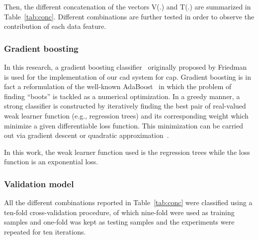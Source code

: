 Then, the different concatenation of the vectors V(.) and T(.) are summarized in Table~\ref{tab:conc}. Different combinations are further tested in order to observe the contribution of each data feature.

\subsubsection{Gradient boosting}\label{subsubsec:gradboost}

In this research, a gradient boosting classifier~\cite{Becker2013} originally proposed by Friedman~\cite{Friedman1999,Friedman2000} is used for the implementation of our \ac{cad} system for \ac{cap}. Gradient boosting is in fact a reformulation of the well-known AdaBoost~\cite{Freund1997} in which the problem of finding ``boots'' is tackled as a numerical optimization. In a greedy manner, a strong classifier is constructed by iteratively finding the best pair of real-valued weak learner function (e.g., regression trees) and its corresponding weight which minimize a given differentiable loss function. This minimization can be carried out via gradient descent or quadratic approximation~\cite{Zheng2008}.

In this work, the weak learner function used is the regression trees while the loss function is an exponential loss.

\subsubsection{Validation model}\label{subsubsec:valmod}

All the different combinations reported in Table~\ref{tab:conc} were classified using a ten-fold cross-validation procedure, of which nine-fold were used as training samples and one-fold was kept as testing samples and the experiments were repeated for ten iterations. 

